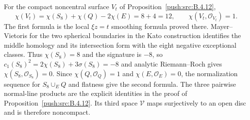 \begin{remark}
\hypertarget{tag-PT14}{}\label{I:quadric-parabolic-euler}
For the compact noncentral surface $V_t$ of Proposition~\ref{push:src:B.4.12},
\[
 \chi(V_t)=\chi(S_8)+\chi(Q)-2\chi(E)=8+4=12,
 \qquad \chi(V_t,\mathcal O_{V_t})=1.
\]
The first formula is the local $\xi z=t$ smoothing formula proved there. Mayer--Vietoris for the two spherical boundaries in the Kato construction identifies the middle homology and its intersection form with the eight negative exceptional classes. Thus $\chi(S_8)=8$ and the signature is $-8$, so $c_1(S_8)^2=2\chi(S_8)+3\sigma(S_8)=-8$ and analytic Riemann--Roch gives $\chi(S_8,\mathcal O_{S_8})=0$. Since $\chi(Q,\mathcal O_Q)=1$ and $\chi(E,\mathcal O_E)=0$, the normalization sequence for $S_8\cup_E Q$ and flatness give the second formula. The three pairwise normal-line products are the explicit identities in the proof of Proposition~\ref{push:src:B.4.12}. Its third space $\mathcal V$ maps surjectively to an open disc and is therefore noncompact.
\end{remark}
